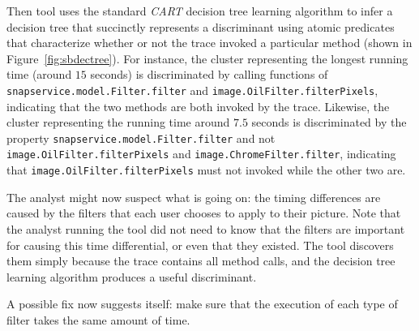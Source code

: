 \documentclass{article}
\begin{document}
Then tool uses the
standard \emph{CART} decision tree learning
algorithm to infer a decision tree that
succinctly represents a discriminant
using atomic predicates that characterize
whether or not the trace invoked a particular method (shown in Figure~\ref{fig:sbdectree}).
For instance, the cluster representing the longest running time (around $15$ seconds) is
discriminated by calling functions of \texttt{snapservice.model.Filter.filter} and 
\texttt{image.OilFilter.filterPixels}, indicating that the two methods
are both invoked by the trace. Likewise, the cluster representing the
running time around $7.5$ seconds is discriminated by the
property \texttt{snapservice.model.Filter.filter} and
not \texttt{image.OilFilter.filterPixels} and
\texttt{image.ChromeFilter.filter}, indicating that
\texttt{image.OilFilter.filterPixels} must not invoked
while the other two are.

The analyst might now suspect what is going on: the timing
differences are caused by the filters that each user chooses to apply
to their picture. %
Note that the analyst running the tool did not need to
know that the filters are important for causing this time differential, or even that
they existed. The tool discovers them simply because the trace
contains all method calls, and the decision tree learning algorithm
produces a useful discriminant.

A possible fix now suggests itself: make sure that the execution of
each type of filter takes the same amount of time.
\end{document}
